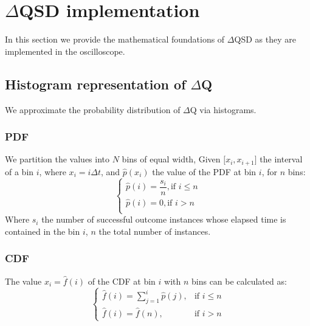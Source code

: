 \section{$\Delta$QSD implementation}
    In this section we provide the mathematical foundations of $\Delta$QSD as they are implemented in the oscilloscope.
    \subsection{Histogram representation of $\Delta$Q}
    We approximate the probability distribution of $\Delta$Q via histograms.
   \subsubsection{PDF}
   We partition the values into $N$ bins of equal width, Given $\lbrack x_i, x_{i+1} \rbrack$ the interval of a bin $i$, where $x_i = i\Delta t$, and $\hat{p}(x_i)$ the value of the PDF at bin $i$, for $n$ bins:
        \begin{equation}
            \begin{cases}
                \hat{p}(i) = \dfrac{s_i}{n}, \text{if } i \le n \\
                \hat{p}(i) = 0, \text{if } i > n \\
            \end{cases}
            \label{eq:pdf}
        \end{equation}
    Where $s_i$ the number of successful outcome instances whose elapsed time is contained in the bin $i$, $n$ the total number of instances. \cite{stat}

    \subsubsection{CDF}
        The value $x_i = \hat{f}(i)$ of the CDF at bin $i$ with $n$ bins can be calculated as:
        \begin{equation}
            \begin{cases}
                \hat{f}(i) = \sum_{j=1}^{i} \hat{p}(j), & \text{if } i \le n \\  
                \hat{f}(i) = \hat{f}(n), & \text{if } i > n 
            \end{cases}
            \label{eq:cdf}
        \end{equation}
 
